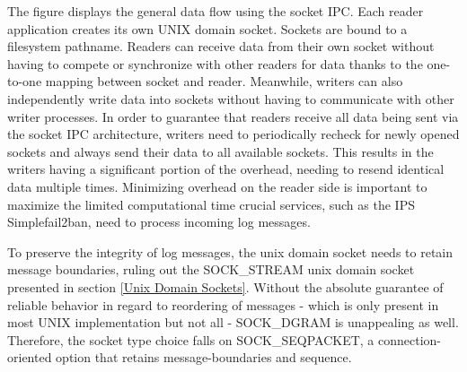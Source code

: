 The figure displays the general data flow using the socket IPC.
Each reader application creates its own UNIX domain socket.
Sockets are bound to a filesystem pathname.
Readers can receive data from their own socket without having to compete or synchronize with other readers for data thanks to the one-to-one mapping between socket and reader.
Meanwhile, writers can also independently write data into sockets without having to communicate with other writer processes.
In order to guarantee that readers receive all data being sent via the socket IPC architecture, writers need to periodically recheck for newly opened sockets and always send their data to all available sockets.
This results in the writers having a significant portion of the overhead, needing to resend identical data multiple times.
Minimizing overhead on the reader side is important to maximize the limited computational time crucial services, such as the IPS Simplefail2ban, need to process incoming log messages.

To preserve the integrity of log messages, the unix domain socket needs to retain message boundaries, ruling out the SOCK\_STREAM unix domain socket presented in section \ref{Unix Domain Sockets}.
Without the absolute guarantee of reliable behavior in regard to reordering of messages - which is only present in most UNIX implementation but not all\cite{man:unixsockets} - SOCK\_DGRAM is unappealing as well.
Therefore, the socket type choice falls on SOCK\_SEQPACKET, a connection-oriented option that retains message-boundaries and sequence.